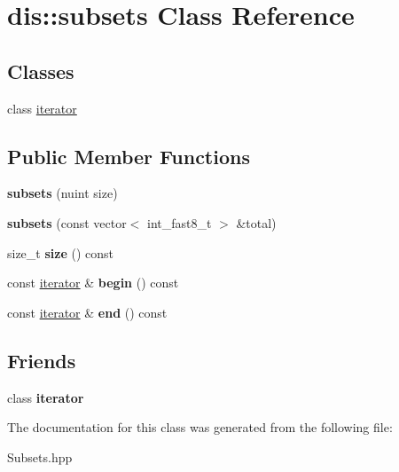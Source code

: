 \hypertarget{classdis_1_1subsets}{\section{dis\-:\-:subsets Class Reference}
\label{classdis_1_1subsets}
}
\subsection*{Classes}
\begin{DoxyCompactItemize}
\item 
class \hyperlink{classdis_1_1subsets_1_1iterator}{iterator}
\end{DoxyCompactItemize}
\subsection*{Public Member Functions}
\begin{DoxyCompactItemize}
\item 
\hypertarget{classdis_1_1subsets_a4e59b381b65f777b1e6305ce03e03016}{{\bfseries subsets} (nuint size)}\label{classdis_1_1subsets_a4e59b381b65f777b1e6305ce03e03016}

\item 
\hypertarget{classdis_1_1subsets_a747b7464d1041348c86604f2f9fc90f4}{{\bfseries subsets} (const vector$<$ int\-\_\-fast8\-\_\-t $>$ \&total)}\label{classdis_1_1subsets_a747b7464d1041348c86604f2f9fc90f4}

\item 
\hypertarget{classdis_1_1subsets_aa47b7a9b15c93ec2e860b159aa0122c3}{size\-\_\-t {\bfseries size} () const }\label{classdis_1_1subsets_aa47b7a9b15c93ec2e860b159aa0122c3}

\item 
\hypertarget{classdis_1_1subsets_a1a89e77a6c58d5f6452f0cd13ffd37a7}{const \hyperlink{classdis_1_1subsets_1_1iterator}{iterator} \& {\bfseries begin} () const }\label{classdis_1_1subsets_a1a89e77a6c58d5f6452f0cd13ffd37a7}

\item 
\hypertarget{classdis_1_1subsets_a69dc9a0f494feaaf7878b415e127042b}{const \hyperlink{classdis_1_1subsets_1_1iterator}{iterator} \& {\bfseries end} () const }\label{classdis_1_1subsets_a69dc9a0f494feaaf7878b415e127042b}

\end{DoxyCompactItemize}
\subsection*{Friends}
\begin{DoxyCompactItemize}
\item 
\hypertarget{classdis_1_1subsets_a67171474c4da6cc8efe0c7fafefd2b2d}{class {\bfseries iterator}}\label{classdis_1_1subsets_a67171474c4da6cc8efe0c7fafefd2b2d}

\end{DoxyCompactItemize}


The documentation for this class was generated from the following file\-:\begin{DoxyCompactItemize}
\item 
Subsets.\-hpp\end{DoxyCompactItemize}
